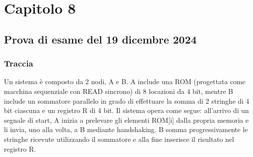 \chapter{Capitolo 8}
\section{Prova di esame del 19 dicembre 2024}
\subsection{Traccia}
 Un sistema è composto da 2 nodi, A e B. A include una ROM (progettata come macchina sequenziale con READ sincrono) di 8 locazioni da 4 bit, mentre B include un sommatore 
parallelo in grado di effettuare la somma di 2 stringhe di 4 bit ciascuna e un registro R di 4 bit. Il sistema opera come segue: all’arrivo di un segnale di start,  A inizia a prelevare gli elementi ROM[i] dalla propria memoria e li invia, uno alla volta, a B mediante handshaking. B somma progressivamente le stringhe ricevute utilizzando il sommatore e alla fine inserisce il risultato nel registro R.

